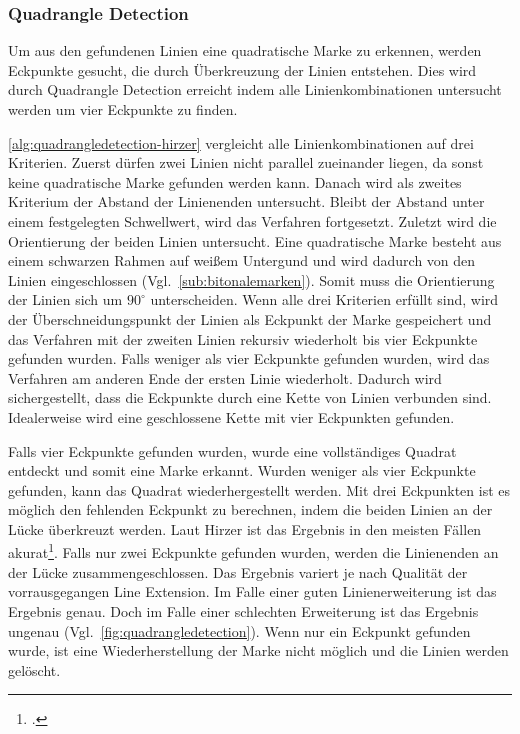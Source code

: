 \subsubsection{Quadrangle Detection} %
\label{sub:quadrangle_detection}

Um aus den gefundenen Linien eine quadratische Marke zu erkennen, werden Eckpunkte gesucht, die durch Überkreuzung der
 Linien entstehen. Dies wird durch Quadrangle Detection erreicht indem alle Linienkombinationen untersucht werden um
 vier Eckpunkte zu finden.



\autoref{alg:quadrangledetection-hirzer} vergleicht alle Linienkombinationen auf drei Kriterien. Zuerst dürfen zwei
 Linien nicht parallel zueinander liegen, da sonst keine quadratische Marke gefunden werden kann. Danach wird als
 zweites Kriterium der Abstand der Linienenden untersucht. Bleibt der Abstand unter einem festgelegten Schwellwert,
 wird das Verfahren fortgesetzt. Zuletzt wird die Orientierung der beiden Linien untersucht. Eine quadratische Marke
 besteht aus einem schwarzen Rahmen auf weißem Untergund und wird dadurch von den Linien eingeschlossen
 (Vgl.~\autoref{sub:bitonalemarken}). Somit muss die Orientierung der Linien sich um $90^\circ$ unterscheiden. Wenn
 alle drei Kriterien erfüllt sind, wird der Überschneidungspunkt der Linien als Eckpunkt der Marke gespeichert und das
 Verfahren mit der zweiten Linien rekursiv wiederholt bis vier Eckpunkte gefunden wurden. Falls weniger als vier
 Eckpunkte gefunden wurden, wird das Verfahren am anderen Ende der ersten Linie wiederholt. Dadurch wird
 sichergestellt, dass die Eckpunkte durch eine Kette von Linien verbunden sind. Idealerweise wird eine geschlossene
 Kette mit vier Eckpunkten gefunden.

Falls vier Eckpunkte gefunden wurden, wurde eine vollständiges Quadrat entdeckt und somit eine Marke erkannt. Wurden
 weniger als vier Eckpunkte gefunden, kann das Quadrat wiederhergestellt werden. Mit drei Eckpunkten ist es möglich den
 fehlenden Eckpunkt zu berechnen, indem die beiden Linien an der Lücke überkreuzt werden. Laut Hirzer ist das Ergebnis in
 den meisten Fällen akurat\footcite[Vgl.][S.15]{hirzer08}. Falls nur zwei Eckpunkte gefunden wurden, werden die
 Linienenden an der Lücke zusammengeschlossen. Das Ergebnis variert je nach Qualität der vorrausgegangen Line
 Extension. Im Falle einer guten Linienerweiterung ist das Ergebnis genau. Doch im Falle einer schlechten Erweiterung
 ist das Ergebnis ungenau (Vgl.~\autoref{fig:quadrangledetection}). Wenn nur ein Eckpunkt gefunden wurde, ist eine
 Wiederherstellung der Marke nicht möglich und die Linien werden gelöscht.

